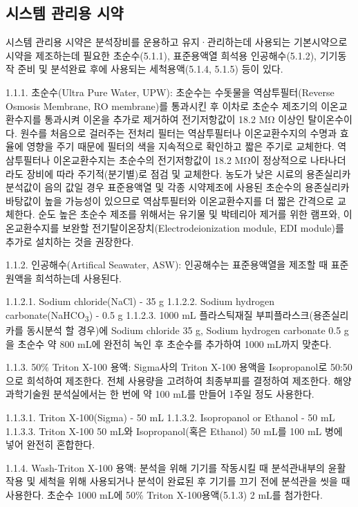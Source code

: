 \documentclass[
]{book}
\begin{document}
\hypertarget{uxc2dcuxc2a4uxd15c-uxad00uxb9acuxc6a9-uxc2dcuxc57d}{%
\subsection{시스템 관리용 시약}\label{uxc2dcuxc2a4uxd15c-uxad00uxb9acuxc6a9-uxc2dcuxc57d}}

시스템 관리용 시약은 분석장비를 운용하고 유지·관리하는데 사용되는 기본시약으로 시약을 제조하는데 필요한 초순수(5.1.1), 표준용액열 희석용 인공해수(5.1.2), 기기동작 준비 및 분석완료 후에 사용되는 세척용액(5.1.4, 5.1.5) 등이 있다.

1.1.1. 초순수(Ultra Pure Water, UPW): 초순수는 수돗물을 역삼투필터(Reverse Osmosis Membrane, RO membrane)를 통과시킨 후 이차로 초순수 제조기의 이온교환수지를 통과시켜 이온을 추가로 제거하여 전기저항값이 18.2 MΩ 이상인 탈이온수이다. 원수를 처음으로 걸러주는 전처리 필터는 역삼투필터나 이온교환수지의 수명과 효율에 영향을 주기 때문에 필터의 색을 지속적으로 확인하고 짧은 주기로 교체한다. 역삼투필터나 이온교환수지는 초순수의 전기저항값이 18.2 MΩ이 정상적으로 나타나더라도 장비에 따라 주기적(분기별)로 점검 및 교체한다. 농도가 낮은 시료의 용존실리카 분석값이 음의 값일 경우 표준용액열 및 각종 시약제조에 사용된 초순수의 용존실리카 바탕값이 높을 가능성이 있으므로 역삼투필터와 이온교환수지를 더 짧은 간격으로 교체한다. 순도 높은 초순수 제조를 위해서는 유기물 및 박테리아 제거를 위한 램프와, 이온교환수지를 보완할 전기탈이온장치(Electrodeionization module, EDI module)를 추가로 설치하는 것을 권장한다.

1.1.2. 인공해수(Artifical Seawater, ASW): 인공해수는 표준용액열을 제조할 때 표준원액을 희석하는데 사용된다.

1.1.2.1. Sodium chloride(NaCl) - 35 g
1.1.2.2. Sodium hydrogen carbonate(NaHCO\textsubscript{3}) - 0.5 g
1.1.2.3. 1000 mL 플라스틱재질 부피플라스크(용존실리카를 동시분석 할 경우)에 Sodium chloride 35 g, Sodium hydrogen carbonate 0.5 g을 초순수 약 800 mL에 완전히 녹인 후 초순수를 추가하여 1000 mL까지 맞춘다.

1.1.3. 50\% Triton X-100 용액: Sigma사의 Triton X-100 용액을 Isopropanol로 50:50으로 희석하여 제조한다. 전체 사용량을 고려하여 최종부피를 결정하여 제조한다. 해양과학기술원 분석실에서는 한 번에 약 100 mL를 만들어 1주일 정도 사용한다.

1.1.3.1. Triton X-100(Sigma) - 50 mL
1.1.3.2. Isopropanol or Ethanol - 50 mL
1.1.3.3. Triton X-100 50 mL와 Isopropanol(혹은 Ethanol) 50 mL를 100 mL 병에 넣어 완전히 혼합한다.

1.1.4. Wash-Triton X-100 용액: 분석을 위해 기기를 작동시킬 때 분석관내부의 윤활 작용 및 세척을 위해 사용되거나 분석이 완료된 후 기기를 끄기 전에 분석관을 씻을 때 사용한다. 초순수 1000 mL에 50\% Triton X-100용액(5.1.3) 2 mL를 첨가한다.
\end{document}
